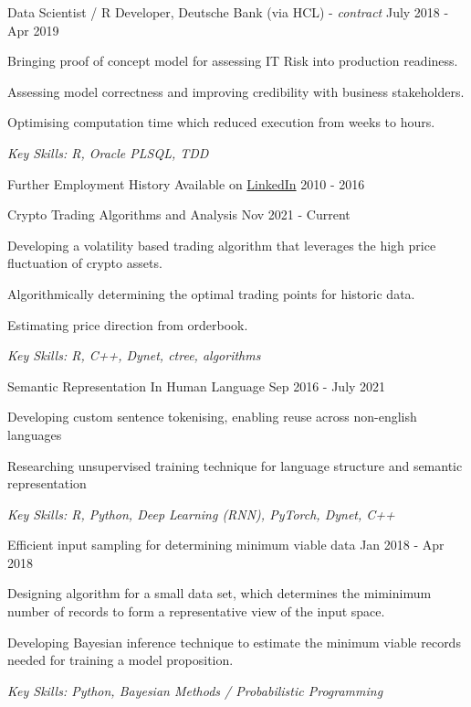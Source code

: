 \documentclass[11pt,article,oneside]{memoir}
\newenvironment{itemize*}{%
  \renewcommand\labelitemi{\textbullet}
  \footnotesize
  \begin{itemize}%
    \setlength{\itemsep}{0pt}}%
  {\end{itemize}
}
\begin{document}

\normalsize
\medskip
\ind Data Scientist / R Developer, Deutsche Bank (via HCL) - \emph{contract} \hfill July 2018 - Apr 2019
\begin{itemize*}
    \item Bringing proof of concept model for assessing IT Risk into production readiness.
    \item Assessing model correctness and improving credibility with business stakeholders. 
    \item Optimising computation time which reduced execution from weeks to hours.
\end{itemize*}
\ind \hspace{0.35in} \footnotesize \emph{Key Skills: R, Oracle PLSQL, TDD}

\normalsize
\medskip
\ind Further Employment History Available on \href{https://uk.linkedin.com/in/adrian-ionita-6a923129}{LinkedIn} \hfill 2010 - 2016


\normalsize
\medskip
\ind Crypto Trading Algorithms and Analysis \hfill Nov 2021 - Current
\begin{itemize*}
  \item Developing a volatility based trading algorithm that leverages the high price fluctuation of crypto assets.
  \item Algorithmically determining the optimal trading points for historic data. 
  \item Estimating price direction from orderbook.
\end{itemize*}
\ind \hspace{0.35in} \footnotesize \emph{Key Skills: R, C++, Dynet, ctree, algorithms }

\normalsize
\medskip
\ind Semantic Representation In Human Language \hfill Sep 2016 - July 2021
\begin{itemize*}
  \item Developing custom sentence tokenising, enabling reuse across non-english languages
  \item Researching unsupervised training technique for language structure and semantic representation
\end{itemize*}
\ind \hspace{0.35in} \footnotesize \emph{Key Skills: R, Python, Deep Learning (RNN), PyTorch, Dynet, C++}

\normalsize
\medskip
\ind Efficient input sampling for determining minimum viable data \hfill Jan 2018 - Apr 2018
\begin{itemize*}
  \item Designing algorithm for a small data set, which determines the miminimum number of records to form a representative view of the input space.
  \item Developing Bayesian inference technique to estimate the minimum viable records needed for training a model proposition.
\end{itemize*}
\ind \hspace{0.35in} \footnotesize \emph{Key Skills: Python, Bayesian Methods / Probabilistic Programming}
\end{document}
